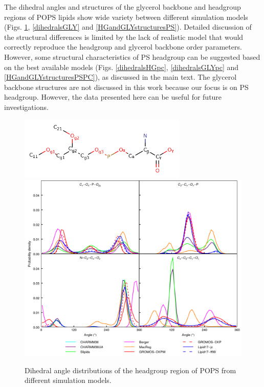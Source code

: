 \documentclass[journal=jpcbfk]{achemso}
\begin{document}
The dihedral angles and structures of the glycerol backbone and headgroup regions of POPS lipids show
wide variety between different simulation models (Figs. \ref{dihedralsHG}, \ref{dihedralsGLY} and \ref{HGandGLYstructuresPS}).
Detailed discussion of the structural differences is limited by the lack of realistic model that would correctly reproduce the
headgroup and glycerol backbone order parameters. However, some structural characteristics
of PS headgroup can be suggested based on the best available models
(Figs. \ref{dihedralsHGpc}, \ref{dihedralsGLYpc} and \ref{HGandGLYstructuresPSPC}), as discussed in the main text.
The glycerol backbone structures are not discussed in this work because our focus is on PS headgroup.
However, the data presented here can be useful for future investigations.

\begin{figure}[]
  \centering
  \includegraphics[width=8.0cm]{../Figs/PS_Labels.png}
  \includegraphics[width=16.0cm]{../Figs/figS7.png}
  \caption{\label{dihedralsHG}
    Dihedral angle distributions of the headgroup region of POPS from different simulation models.
  }
\end{figure}
\end{document}
